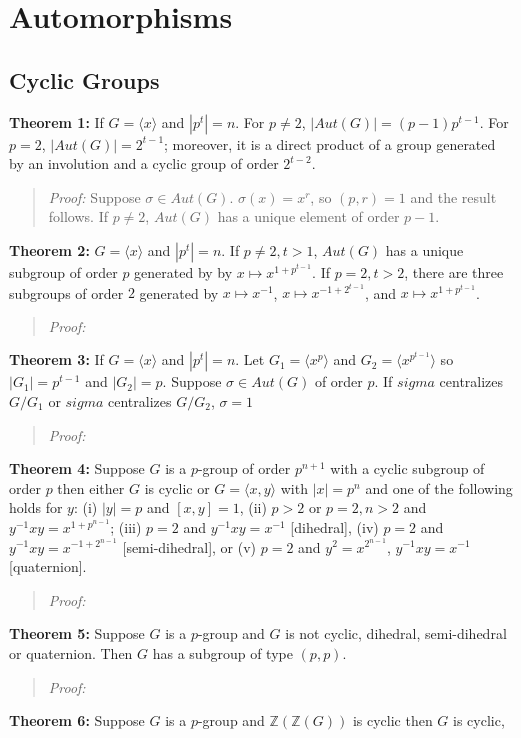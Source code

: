 \chapter{Automorphisms}
\section {Cyclic Groups}
{\bf Theorem 1:}
If $G= \langle x \rangle $ and $|p^t|=n$.  For $p \ne 2$, $|Aut(G)|= (p-1)p^{t-1}$.  For $p=2$, $|Aut(G)|= 2^{t-1}$;
moreover, it is a direct product of a group generated by an  involution and a cyclic group of order $2^{t-2}$.
\begin{quote}
\emph{Proof:} Suppose $\sigma \in Aut(G)$.  $\sigma(x)= x^r$, so $(p,r)=1$ and the result follows.
If $p \ne 2$, $Aut(G)$ has a unique element of order $p-1$.
\end{quote}
{\bf Theorem 2:} $G= \langle x \rangle $ and $|p^t|=n$.  If $p \ne 2, t>1$, $Aut(G)$ has a unique subgroup of order
$p$ generated by by $x \mapsto x^{1+p^{t-1}}$.  If $p=2, t > 2$, there are three subgroups of order $2$ generated by
$x \mapsto x^{-1}$,
$x \mapsto x^{-1 + 2^{t-1}}$, and
$x \mapsto x^{1 + p^{t-1}}$.
\begin{quote}
\emph{Proof:}
\end{quote}
{\bf Theorem 3:} If $G= \langle x \rangle $ and $|p^t|=n$. Let 
$G_1 = \langle x^{p} \rangle$ and
$G_2 = \langle x^{p^{t-1}} \rangle$ so $|G_1| = p^{t-1}$ and $|G_2|=p$. Suppose $\sigma \in Aut(G)$
of order $p$.
If $sigma$ centralizes $G/G_1$ or $sigma$ centralizes $G/G_2$, $\sigma = 1$
\begin{quote}
\emph{Proof:}
\end{quote}
{\bf Theorem 4:} Suppose $G$ is a $p$-group of order $p^{n+1}$ with a cyclic subgroup of order $p$ then either
$G$ is cyclic or $G= \langle x, y \rangle$ with $|x|=p^n$ and one of the following holds for $y$:
(i) $|y| = p$ and $[x,y]=1$,
(ii) $p > 2$ or $p=2, n>2$ and $y^{-1}x y = x^{1+p^{n-1}}$;
(iii) $p=2$ and $y^{-1}x y = x^{-1}$ [dihedral],
(iv) $p=2$ and $y^{-1}x y = x^{-1 + 2^{n-1}}$ [semi-dihedral], or
(v) $p=2$ and $y^2= x^{2^{n-1}}$, $y^{-1} x y = x^{-1}$ [quaternion].
\begin{quote}
\emph{Proof:}
\end{quote}
{\bf Theorem 5:} Suppose $G$ is a $p$-group and $G$ is not cyclic, dihedral, semi-dihedral or quaternion.  Then
$G$ has a subgroup of type $(p,p)$.
\begin{quote}
\emph{Proof:}
\end{quote}
{\bf Theorem 6:} Suppose $G$ is a $p$-group and ${\mathbb Z}({\mathbb Z}(G))$ is cyclic then $G$ is cyclic,
